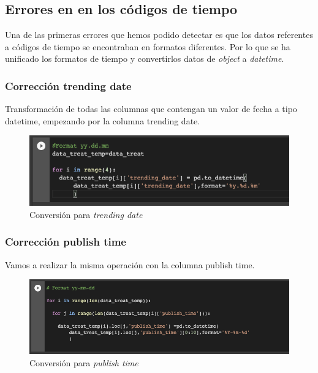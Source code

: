 \documentclass[a4paper,12pt]{article}
\begin{document}
\subsection{Errores en en los c\'odigos de tiempo}

Una de las primeras errores que hemos podido detectar es que los datos referentes a c\'odigos de tiempo se encontraban en formatos diferentes. Por lo que se ha unificado los formatos de tiempo y convertirlos datos de {\itshape object} a {\itshape datetime}.

\subsubsection{Correcci\'on  trending date}

Transformaci\'on de todas las columnas que contengan un valor de fecha a tipo datetime, empezando por la columna trending date.

\begin{figure}[h!]
 \centering
\includegraphics[width=13cm]{correc_trending.png}
\caption{Conversi\'on para {\itshape trending date}}
\label{fig:trend_date}
\end{figure}

\subsubsection{Correcci\'on  publish time}
Vamos a realizar la misma operaci\'on con la columna publish time.

\begin{figure}[h!]
\centering
\includegraphics[width=13cm]{correc_publish.png}
\caption{Conversi\'on para {\itshape publish time}}
\label{fig:pub_date}
\end{figure}
\end{document}
